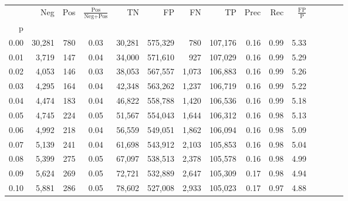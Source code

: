 \begin{tabular}{rrrcrrrrrrrrrrr}
\toprule
{} &     Neg &    Pos & $\frac{\text{Pos}}{\text{Neg}+\text{Pos}}$ &       TN &       FP &       FN &       TP &  Prec &   Rec & $\frac{\text{FP}}{\text{P}}$ \\
p    &         &        &                                            &          &          &          &          &       &       &                              \\
\midrule
0.00 &  30,281 &    780 &                                       0.03 &   30,281 &  575,329 &      780 &  107,176 &  0.16 &  0.99 &                         5.33 \\
0.01 &   3,719 &    147 &                                       0.04 &   34,000 &  571,610 &      927 &  107,029 &  0.16 &  0.99 &                         5.29 \\
0.02 &   4,053 &    146 &                                       0.03 &   38,053 &  567,557 &    1,073 &  106,883 &  0.16 &  0.99 &                         5.26 \\
0.03 &   4,295 &    164 &                                       0.04 &   42,348 &  563,262 &    1,237 &  106,719 &  0.16 &  0.99 &                         5.22 \\
0.04 &   4,474 &    183 &                                       0.04 &   46,822 &  558,788 &    1,420 &  106,536 &  0.16 &  0.99 &                         5.18 \\
0.05 &   4,745 &    224 &                                       0.05 &   51,567 &  554,043 &    1,644 &  106,312 &  0.16 &  0.98 &                         5.13 \\
0.06 &   4,992 &    218 &                                       0.04 &   56,559 &  549,051 &    1,862 &  106,094 &  0.16 &  0.98 &                         5.09 \\
0.07 &   5,139 &    241 &                                       0.04 &   61,698 &  543,912 &    2,103 &  105,853 &  0.16 &  0.98 &                         5.04 \\
0.08 &   5,399 &    275 &                                       0.05 &   67,097 &  538,513 &    2,378 &  105,578 &  0.16 &  0.98 &                         4.99 \\
0.09 &   5,624 &    269 &                                       0.05 &   72,721 &  532,889 &    2,647 &  105,309 &  0.17 &  0.98 &                         4.94 \\
0.10 &   5,881 &    286 &                                       0.05 &   78,602 &  527,008 &    2,933 &  105,023 &  0.17 &  0.97 &                         4.88 \\

\end{tabular}
